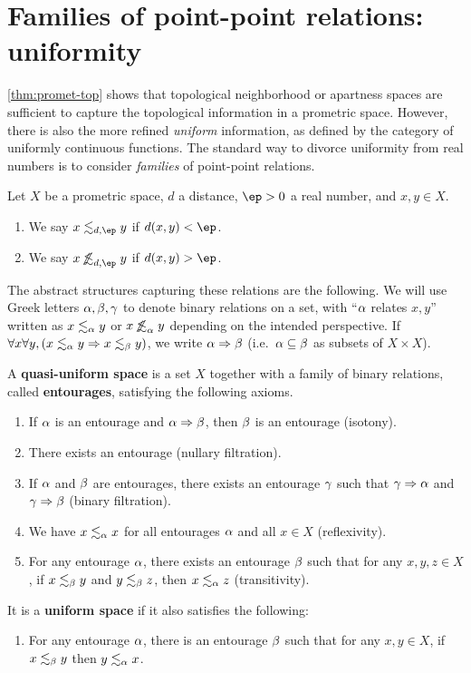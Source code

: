 \documentclass{article}
\def\oapt{\mathrel{\!\not\,\not\lesssim}}
\def\leapx{\lesssim}
\let\implies\Rightarrow
\begin{document}
\section{Families of point-point relations: uniformity}
\label{sec:uniformity}

\cref{thm:promet-top} shows that topological neighborhood or apartness spaces are sufficient to capture the topological information in a prometric space.
However, there is also the more refined \emph{uniform} information, as defined by the category of uniformly continuous functions.
The standard way to divorce uniformity from real numbers is to consider \emph{families} of point-point relations.

\begin{defn}
  Let $X$ be a prometric space, $d$ a distance, $\ep>0$ a real number, and $x,y\in X$.
  \begin{enumerate}
  \item We say $x \leapx_{d,\ep} y$ if $d(x,y)<\ep$.
  \item We say $x \oapt_{d,\ep} y$ if $d(x,y)>\ep$.
  \end{enumerate}
\end{defn}

The abstract structures capturing these relations are the following.
We will use Greek letters $\alpha,\beta,\gamma$ to denote binary relations on a set, with ``$\alpha$ relates $x,y$'' written as $x\leapx_\al y$ or $x \oapt_\al y$ depending on the intended perspective.
If $\forall x\forall y,(x\leapx_\al y \implies x\leapx_\be y)$, we write $\al\implies\be$ (i.e.\ $\alpha\subseteq \beta$ as subsets of $X\times X$).

\begin{defn}
  A \textbf{quasi-uniform space} is a set $X$ together with a family of binary relations, called \textbf{entourages}, satisfying the following axioms.
  \begin{enumerate}
  \item If $\alpha$ is an entourage and $\al\implies\be$, then $\beta$ is an entourage (isotony).
  \item There exists an entourage (nullary filtration).
  \item If $\alpha$ and $\beta$ are entourages, there exists an entourage $\gamma$ such that $\gm\implies\al$ and $\gm\implies\be$ (binary filtration).
  \item We have $x\leapx_\al x$ for all entourages $\alpha$ and all $x\in X$ (reflexivity).
  \item For any entourage $\alpha$, there exists an entourage $\beta$ such that for any $x,y,z\in X$, if $x\leapx_\be y$ and $y\leapx_\be z$, then $x\leapx_\al z$ (transitivity).
  \end{enumerate}
  It is a \textbf{uniform space} if it also satisfies the following:
  \begin{enumerate}[resume]
  \item For any entourage $\alpha$, there is an entourage $\beta$ such that for any $x,y\in X$, if $x\leapx_\be y$ then $y\leapx_\al x$.
  \end{enumerate}
\end{defn}
\end{document}
